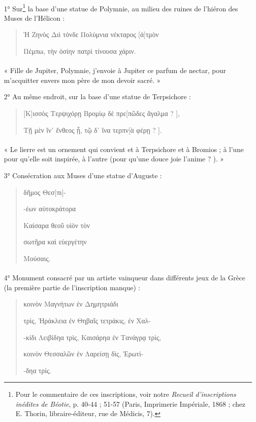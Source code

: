 \documentclass[a4paper, 11pt, oneside, polutonikogreek, french]{article}
\begin{document}
\paragraph{}
1° Sur\footnote{Pour le commentaire de ces inscriptions, voir notre \emph{Recueil d'inscriptions inédites de Béotie}, p. 40-44 ; 51-57 (Paris, Imprimerie Impériale, 1868 ; chez E. Thorin, libraire-éditeur, rue de Médicis, 7).} la base d'une statue de Polymnie, au milieu des ruines de l'hiéron des Muses de l'Hélicon :
\begin{quotation}
Ἡ Ζηνὸς Διὶ τόνδε Πολύμνια νέκταρος [ἀ]τμὸν

\hspace*{5mm}Πέμπω, τὴν ὁσίην πατρὶ τίνουσα χάριν.
\end{quotation}
\paragraph{}
« Fille de Jupiter, Polymnie, j'envoie à Jupiter ce parfum de nectar, pour m'acquitter envers mon père de mon devoir sacré. »

2° Au même endroit, sur la base d'une statue de Terpsichore :
\begin{quotation}
[Κ]ισσὸς Τερψιχόρῃ Βρομίῳ δὲ πρε[πῶδες ἄγαλμα ? ],

\hspace*{5mm}Τῇ μὲν ἵν᾿ ἔνθεος ᾖ, τῷ δ᾽ ἵνα τερπν[ὰ φέρῃ ? ].
\end{quotation}
\paragraph{}
« Le lierre est un ornement qui convient et à Terpsichore et à Bromios ; à l'une pour qu'elle soit inspirée, à l'autre (pour qu'une douce joie l'anime ? ). »

3° Consécration aux Muses d'une statue d'Auguste :
\begin{quotation}
\centering
[Ὁ] δῆμος Θεσ[πι]-

-έων αὐτοκράτορα

Καίσαρα θεοῦ υἱὸν τὸν

σωτῆρα καὶ εὐεργέτην

Μούσαις.
\end{quotation}
\paragraph{}
4° Monument consacré par un artiste vainqueur dans différents jeux de la Grèce (la première partie de l'inscription manque) :
\begin{quotation}
\hspace*{5mm}κοινὸν Μαγνήτων ἐν Δημητριάδι

τρὶς, Ἡράκλεια ἐν Θηβαῖς τετράκις, ἐν Χαλ-

-κίδι Λειβίδηα τρὶς, Καισάρηα ἐν Τανάγρᾳ τρὶς,

κοινὸν Θεσσαλῶν ἐν Λαρείσῃ δὶς, Ἑρωτί-

-δηα τρίς.
\end{quotation}
\end{document}
